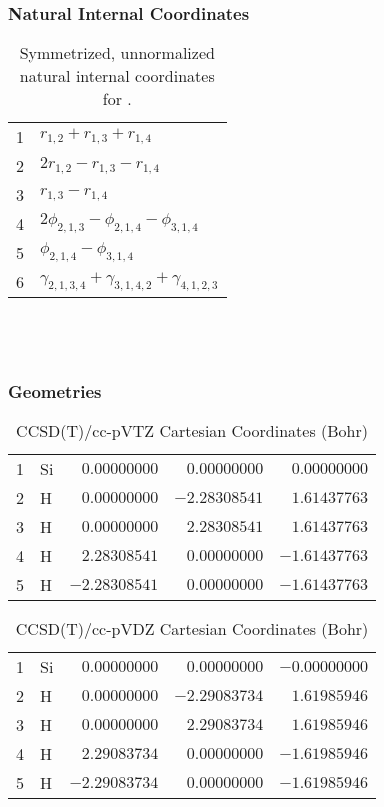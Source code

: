 \documentclass[10pt,oneside]{article}
\begin{document}
\clearpage

\subsubsection*{Natural Internal Coordinates}
\begin{table}[h!]
\centering
\caption{Symmetrized, unnormalized natural internal coordinates for .}
\small
\begin{tabular}{ll}
  1   & $r_{1,2} + r_{1,3} + r_{1,4}$ \\
  2   & $2r_{1,2} - r_{1,3} - r_{1,4}$ \\
  3   & $r_{1,3} - r_{1,4}$ \\
  4   & $2\phi_{2,1,3} - \phi_{2,1,4} - \phi_{3,1,4}$ \\
  5   & $\phi_{2,1,4} - \phi_{3,1,4}$ \\
  6   & $\gamma_{2,1,3,4} + \gamma_{3,1,4,2} + \gamma_{4,1,2,3}$ \\
\end{tabular}
\end{table}

\clearpage

\subsection{\ \ \ }

\subsubsection*{Geometries}
\begin{table}[h!]
\centering
\caption{CCSD(T)/cc-pVTZ Cartesian Coordinates (Bohr)}
\begin{tabular}{llrrr}
1  & Si & $ 0.00000000$ & $ 0.00000000$ & $ 0.00000000$ \\
2  & H  & $ 0.00000000$ & $-2.28308541$ & $ 1.61437763$ \\
3  & H  & $ 0.00000000$ & $ 2.28308541$ & $ 1.61437763$ \\
4  & H  & $ 2.28308541$ & $ 0.00000000$ & $-1.61437763$ \\
5  & H  & $-2.28308541$ & $ 0.00000000$ & $-1.61437763$ \\
\end{tabular}
\end{table}

\begin{table}[h!]
\centering
\caption{CCSD(T)/cc-pVDZ Cartesian Coordinates (Bohr)}
\begin{tabular}{llrrr}
1  & Si & $ 0.00000000$ & $ 0.00000000$ & $-0.00000000$ \\
2  & H  & $ 0.00000000$ & $-2.29083734$ & $ 1.61985946$ \\
3  & H  & $ 0.00000000$ & $ 2.29083734$ & $ 1.61985946$ \\
4  & H  & $ 2.29083734$ & $ 0.00000000$ & $-1.61985946$ \\
5  & H  & $-2.29083734$ & $ 0.00000000$ & $-1.61985946$ \\
\end{tabular}
\end{table}
\end{document}
